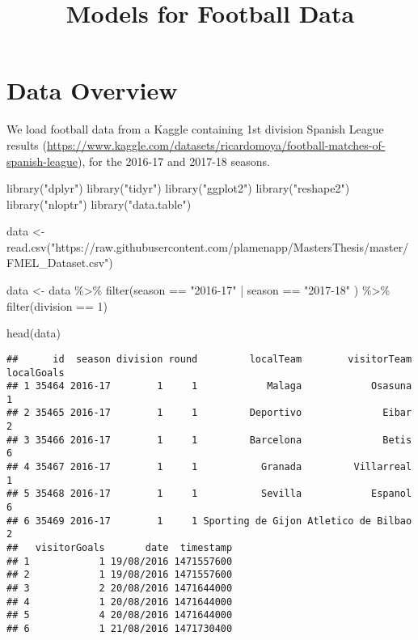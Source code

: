 \documentclass[
]{article}
\title{Models for Football Data}
\author{}
\date{\vspace{-2.5em}}
\newenvironment{Shaded}{\begin{snugshade}}{\end{snugshade}}
\newcommand{\DecValTok}[1]{\textcolor[rgb]{0.00,0.00,0.81}{#1}}
\newcommand{\FunctionTok}[1]{\textcolor[rgb]{0.00,0.00,0.00}{#1}}
\newcommand{\NormalTok}[1]{#1}
\newcommand{\OtherTok}[1]{\textcolor[rgb]{0.56,0.35,0.01}{#1}}
\newcommand{\SpecialCharTok}[1]{\textcolor[rgb]{0.00,0.00,0.00}{#1}}
\newcommand{\StringTok}[1]{\textcolor[rgb]{0.31,0.60,0.02}{#1}}
\begin{document}
\maketitle

{
\setcounter{tocdepth}{2}
\tableofcontents
}
\hypertarget{data-overview}{%
\section{Data Overview}\label{data-overview}}

We load football data from a Kaggle containing 1st division Spanish
League results
(\url{https://www.kaggle.com/datasets/ricardomoya/football-matches-of-spanish-league}),
for the 2016-17 and 2017-18 seasons.

\begin{Shaded}
\begin{Highlighting}[]
\FunctionTok{library}\NormalTok{(}\StringTok{"dplyr"}\NormalTok{)}
\FunctionTok{library}\NormalTok{(}\StringTok{"tidyr"}\NormalTok{)}
\FunctionTok{library}\NormalTok{(}\StringTok{"ggplot2"}\NormalTok{)}
\FunctionTok{library}\NormalTok{(}\StringTok{"reshape2"}\NormalTok{)}
\FunctionTok{library}\NormalTok{(}\StringTok{"nloptr"}\NormalTok{)}
\FunctionTok{library}\NormalTok{(}\StringTok{"data.table"}\NormalTok{)}

\NormalTok{data }\OtherTok{\textless{}{-}} \FunctionTok{read.csv}\NormalTok{(}\StringTok{"https://raw.githubusercontent.com/plamenapp/MastersThesis/master/FMEL\_Dataset.csv"}\NormalTok{)}
 

\NormalTok{data }\OtherTok{\textless{}{-}}\NormalTok{ data }\SpecialCharTok{\%\textgreater{}\%}
  \FunctionTok{filter}\NormalTok{(season }\SpecialCharTok{==} \StringTok{"2016{-}17"} \SpecialCharTok{|}\NormalTok{ season }\SpecialCharTok{==} \StringTok{"2017{-}18"}\NormalTok{ ) }\SpecialCharTok{\%\textgreater{}\%}
  \FunctionTok{filter}\NormalTok{(division }\SpecialCharTok{==} \DecValTok{1}\NormalTok{)}

\FunctionTok{head}\NormalTok{(data)}
\end{Highlighting}
\end{Shaded}

\begin{verbatim}
##      id  season division round         localTeam        visitorTeam localGoals
## 1 35464 2016-17        1     1            Malaga            Osasuna          1
## 2 35465 2016-17        1     1         Deportivo              Eibar          2
## 3 35466 2016-17        1     1         Barcelona              Betis          6
## 4 35467 2016-17        1     1           Granada         Villarreal          1
## 5 35468 2016-17        1     1           Sevilla            Espanol          6
## 6 35469 2016-17        1     1 Sporting de Gijon Atletico de Bilbao          2
##   visitorGoals       date  timestamp
## 1            1 19/08/2016 1471557600
## 2            1 19/08/2016 1471557600
## 3            2 20/08/2016 1471644000
## 4            1 20/08/2016 1471644000
## 5            4 20/08/2016 1471644000
## 6            1 21/08/2016 1471730400
\end{verbatim}
\end{document}
